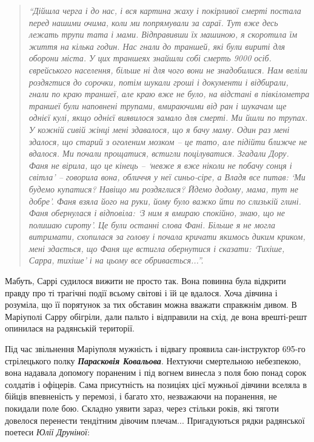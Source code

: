 \begin{quote}
\em\enquote{Дійшла черга і до нас, і вся
картина жаху і покірливої смерті постала перед нашими очима, коли ми
попрямували за сараї. Тут вже десь лежать трупи тата і мами. Відправивши їх
машиною, я скоротила їм життя на кілька годин. Нас гнали до траншей, які були
вириті для оборони міста. У цих траншеях знайшли собі смерть 9000 осіб.
єврейського населення, більше ні для чого вони не знадобилися. Нам веліли
роздягтися до сорочки, потім шукали гроші і документи і відбирали, гнали по
краю траншеї, але краю вже не було, на відстані в півкілометра траншеї були
наповнені трупами, вмираючими від ран і шукачам ще однієї кулі, якщо однієї
виявилося замало для смерті. Ми йшли по трупах. У кожній сивій жінці мені
здавалося, що я бачу маму. Один раз мені здалося, що старий з оголеним мозком –
це тато, але підійти ближче не вдалося. Ми почали прощатися, встигли
поцілуватися. Згадали Дору. Фаня не вірила, що це кінець – \enquote{невже я вже ніколи
не побачу сонця і світла}  – говорила вона, обличчя у неї синьо-сіре, а Владя
все питав: \enquote{Ми будемо купатися? Навіщо ми роздяглися? Йдемо додому, мама, тут
не добре}. Фаня взяла його на руки, йому було важко йти по слизькій глині. Фаня
обернулася і відповіла: \enquote{З ним я вмираю спокійно, знаю, що не полишаю сироту}.
Це були останні слова Фані. Більше я не могла витримати, схопилася за голову і
почала кричати якимось диким криком, мені здається, що Фаня ще встигла
обернутися і сказати: \enquote{Тихіше, Сарра, тихіше} і на цьому все обривається...}.
\end{quote}

Мабуть, Саррі судилося вижити не просто так. Вона повинна була відкрити правду
про ті трагічні події всьому світові і їй це вдалося. Хоча дівчина і розуміла,
що її порятунок за тих обставин можна вважати справжнім дивом. В Маріуполі
Сарру обігріли, дали пальто і відправили на схід, де вона врешті-решт опинилася
на радянській території.


Під час звільнення Маріуполя мужність і відвагу проявила сан\hyp{}інструктор 695-го
стрілецького полку \emph{\textbf{Парасковія Ковальова}}. Нехтуючи смертельною небезпекою, вона
надавала допомогу пораненим і під вогнем винесла з поля бою понад сорок
солдатів і офіцерів. Сама присутність на позиціях цієї мужньої дівчини вселяла
в бійців впевненість у перемозі, і багато хто, незважаючи на поранення, не
покидали поле бою. Складно уявити зараз, через стільки років, які тяготи
довелося перенести тендітним дівочим плечам... Пригадуються рядки радянської
поетеси \emph{Юлії Друніної}:

